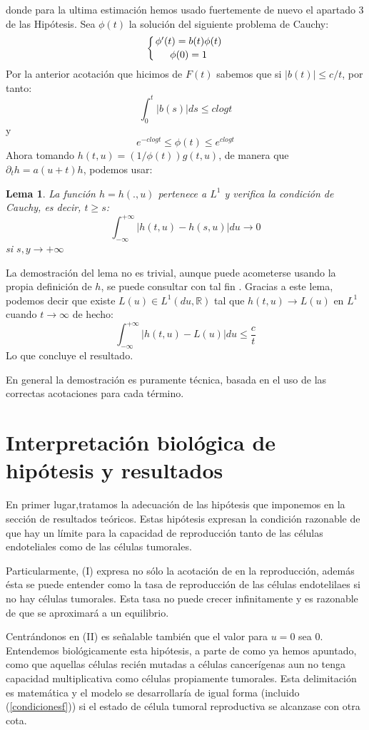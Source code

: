 \documentclass[1p]{elsarticle}
\newtheorem{lem}[thm]{Lema}
\begin{document}
donde para la ultima estimación hemos usado fuertemente de nuevo el apartado 3 de las Hipótesis.
Sea $\phi(t)$ la solución del siguiente problema de Cauchy:
$$\left\{
\phi'(t)=b(t)\phi(t) \atop
\phi(0)=1
\right.$$
Por la anterior acotación que hicimos de $F(t)$  sabemos que si $|b(t)|\leq c / t$, por tanto:
$$\int_{0}^{t}|b(s)| ds\leq c log t$$
y
$$e^{-c log t} \leq\phi(t)\leq e^{c log t}$$
Ahora tomando $h(t, u) = (1 / \phi(t))g(t, u)$, de manera que $\partial_t h = a(u+t)h$, podemos usar:
\begin{lem}
	La función $h=h(.,u)$ pertenece a $L^1$ y verifica la condición de Cauchy, es decir, $t\geq s$:
	$$\int_{-\infty}^{+\infty}|h(t,u)-h(s,u)|du\rightarrow0$$ si $s,y\rightarrow +\infty$
\end{lem}
La demostración del lema no es trivial, aunque puede acometerse usando la propia definición de $h$, se puede consultar con tal fin \cite{original}.
Gracias a este lema, podemos decir que existe $L(u)\in L^1(du,\mathbb{R})$ tal que $h(t,u)\rightarrow L(u)$ en $L^1$ cuando $t\rightarrow\infty$ de hecho:
$$\int_{-\infty}^{+\infty}|h(t,u)-L(u)|du\leq\frac{c}{t}$$
Lo que concluye el resultado.

En general la demostración es puramente técnica, basada en el uso de las correctas acotaciones para cada término. 



\section{Interpretación biológica de hipótesis y resultados}\label{inter}
 En primer lugar,tratamos la adecuación de las hipótesis que imponemos en la sección de resultados teóricos. Estas hipótesis expresan la condición razonable de que hay un límite para la capacidad de reproducción tanto de las células endoteliales como de las células tumorales. 
 
 Particularmente, (I) expresa no sólo la acotación de en la reproducción, además ésta se puede entender como la tasa de reproducción de las células endotelilaes si no hay células tumorales. Esta tasa no puede crecer infinitamente y es razonable de que se aproximará a un equilibrio.
 
 Centrándonos en (II) es señalable también que el valor para $u=0$ sea $0$. Entendemos biológicamente esta hipótesis, a parte de como ya hemos apuntado, como que aquellas células recién mutadas a células cancerígenas aun no tenga capacidad multiplicativa como células propiamente tumorales. Esta delimitación es matemática y el modelo se desarrollaría de igual forma (incluido (\ref{condicionesf})) si el estado de célula tumoral reproductiva se alcanzase con otra cota.
 
\end{document}
